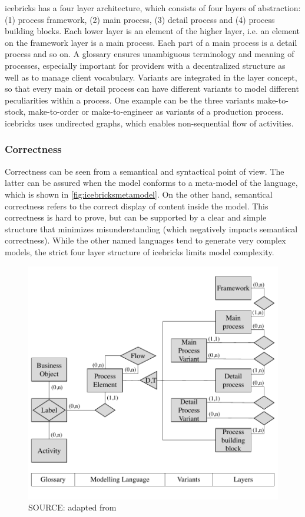 	 icebricks has a four layer architecture, which consists of four layers of abstraction: (1) process framework, (2) main process, (3) detail process and (4) process building blocks. Each lower layer is an element of the higher layer, i.e. an element on the framework layer is a main process. Each part of a main process is a detail process and so on. A glossary ensures unambiguous terminology and meaning of processes, especially important for providers with a decentralized structure as well as to manage client vocabulary. Variants are integrated in the layer concept, so that every main or detail process can have different variants to model different peculiarities within a process. One example can be the three variants make-to-stock, make-to-order or make-to-engineer as variants of a production process. icebricks uses undirected graphs, which enables non-sequential flow of activities. 
	 
	 
	 \subsubsection{Correctness}
	 Correctness can be seen from a semantical and syntactical point of view. The latter can be assured when the model conforms to a meta-model of the language, which is shown in \ref{fig:icebricksmetamodel}. On the other hand, semantical correctness refers to the correct display of content inside the model. This correctness is hard to prove, but can be supported by a clear and simple structure that minimizes misunderstanding (which negatively impacts semantical correctness). While the other named languages tend to generate very complex models, the strict four layer structure of icebricks limits model complexity. 
	 
	 	 \begin{figure}[caption={icebricks meta model}, label={fig:icebricksmetamodel}]
	 	{	\includegraphics[width=.8\textwidth]{figures/icebricksmetamodel.pdf}}
	 	\hspace{6.2cm}	SOURCE:  adapted from \citep[]{Puster2015}
	 \end{figure} 
 
